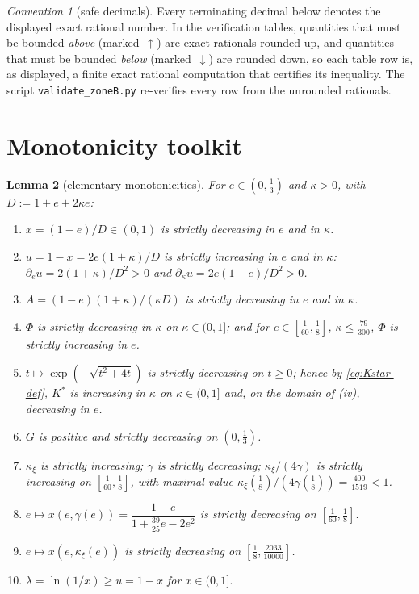 \documentclass[11pt]{article}
\newtheorem{lemma}{Lemma}[section]
\theoremstyle{remark}
\newtheorem{convention}[lemma]{Convention}
\newcommand{\Kstar}{K^{*}}
\newcommand{\kxi}{\kappa_\xi}
\begin{document}
\begin{convention}[safe decimals]\label{conv:safe}
Every terminating decimal below denotes the displayed exact rational
number.  In the verification tables, quantities that must be bounded
\emph{above} (marked~$\uparrow$) are exact rationals rounded up, and
quantities that must be bounded \emph{below} (marked~$\downarrow$) are
rounded down, so each table row is, as displayed, a finite exact rational
computation that certifies its inequality.  The script
\texttt{validate\_zoneB.py} re-verifies every row from the unrounded
rationals.
\end{convention}

\section{Monotonicity toolkit}

\begin{lemma}[elementary monotonicities]\label{lem:mono}
For $e\in(0,\tfrac13)$ and $\kappa>0$, with $D:=1+e+2\kappa e$:
\begin{enumerate}[label=\textup{(\roman*)},itemsep=1pt]
\item $x=(1-e)/D\in(0,1)$ is strictly decreasing in $e$ and in $\kappa$.
\item $u=1-x=2e(1+\kappa)/D$ is strictly increasing in $e$ and in $\kappa$:
$\partial_e u=2(1+\kappa)/D^2>0$ and $\partial_\kappa u=2e(1-e)/D^2>0$.
\item $A=(1-e)(1+\kappa)/(\kappa D)$ is strictly decreasing in $e$ and in
$\kappa$.
\item $\Phi$ is strictly decreasing in $\kappa$ on $\kappa\in(0,1]$;
and for $e\in[\tfrac1{60},\tfrac18]$, $\kappa\le\tfrac{79}{300}$, $\Phi$ is
strictly increasing in $e$.
\item $t\mapsto\exp(-\sqrt{t^2+4t})$ is strictly decreasing on $t\ge0$;
hence by \eqref{eq:Kstar-def}, $\Kstar$ is increasing in $\kappa$ on
$\kappa\in(0,1]$ and, on the domain of \textup{(iv)}, decreasing in $e$.
\item $G$ is positive and strictly decreasing on $(0,\tfrac13)$.
\item $\kxi$ is strictly increasing; $\gamma$ is strictly decreasing;
$\kxi/(4\gamma)$ is strictly increasing on $[\tfrac1{60},\tfrac18]$, with
maximal value $\kxi(\tfrac18)/(4\gamma(\tfrac18))=\tfrac{400}{1519}<1$.
\item $e\mapsto x(e,\gamma(e))=\dfrac{1-e}{1+\tfrac{39}{25}e-2e^2}$ is
strictly decreasing on $[\tfrac1{60},\tfrac18]$.
\item $e\mapsto x(e,\kxi(e))$ is strictly decreasing on
$[\tfrac18,\tfrac{2033}{10000}]$.
\item $\lambda=\ln(1/x)\ge u=1-x$ for $x\in(0,1]$.
\end{enumerate}
\end{lemma}
\end{document}
